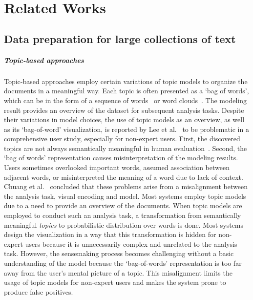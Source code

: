 \section{Related Works}
\subsection{Data preparation for large collections of text}
\subparagraph{Topic-based approaches} 
Topic-based approaches employ certain variations of topic models to organize the documents in a meaningful way.
Each topic is often presented as a `bag of words', which can be in the form of a sequence of words~\cite{yang2017vistopic, cho2016vairoma, dou2013hierarchicaltopics,yan2019clfsemi,han2022hisva, alexander2014serendip, lee2012ivisclustering} or word clouds~\cite{oelke2014topiccoin, cho2016vairoma}.
The modeling result provides an overview of the dataset for subsequent analysis tasks. 
Despite their variations in model choices, the use of topic models as an overview, as well as its `bag-of-word' visualization, is reported by Lee et al.~\cite{lee2017humantopicmodel} to be problematic in a comprehensive user study, especially for non-expert users.
First, the discovered topics are not always semantically meaningful in human evaluation~\cite{chang2009reading}.
Second, the `bag of words' representation causes misinterpretation of the modeling results.
Users sometimes overlooked important words, assumed association between adjacent words, or misinterpreted the meaning of a word due to lack of context.
Chuang et al.~\cite{chuang2012interpretation} concluded that these problems arise from a misalignment between the analysis task, visual encoding and model.
Most systems employ topic models due to a need to provide an overview of the documents.
When topic models are employed to conduct such an analysis task, a transformation from semantically meaningful \textit{topics} to probabilistic distribution over words is done.
Most systems design the visualization in a way that this transformation is hidden for non-expert users because it is unnecessarily complex and unrelated to the analysis task.
However, the sensemaking process becomes challenging without a basic understanding of the model because the `bag-of-words' representation is too far away from the user's mental picture of a topic.
This misalignment limits the usage of topic models for non-expert users and makes the system prone to produce false positives.

